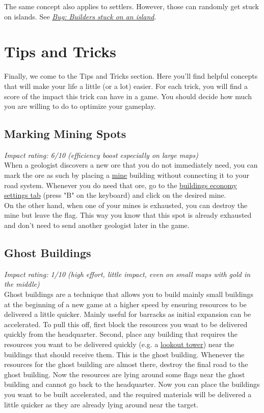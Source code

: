 \documentclass[12pt]{article}
\begin{document}
The same concept also applies to settlers. However, those can randomly get stuck on islands. See \textit{\hyperref[sec:buildersstuckonisland]{Bug: Builders stuck on an island}}.

\section{Tips and Tricks}
\label{sec:tipsandtricks}

Finally, we come to the Tips and Tricks section. Here you'll find helpful concepts that will make your life a little (or a lot) easier. For each trick, you will find a score of the impact this trick can have in a game. You should decide how much you are willing to do to optimize your gameplay.

\subsection{Marking Mining Spots}

\textit{Impact rating: 6/10 (efficiency boost especially on large maps)}\\

When a geologist discovers a new ore that you do not immediately need, you can mark the ore as such by placing a \hyperref[sec:mines]{mine} building without connecting it to your road system. Whenever you do need that ore, go to the \hyperref[sec:economybuildings]{buildings economy settings tab} (press "B" on the keyboard) and click on the desired mine.\\

On the other hand, when one of your mines is exhausted, you can destroy the mine but leave the flag. This way you know that this spot is already exhausted and don't need to send another geologist later in the game.

\subsection{Ghost Buildings}
\label{sec:ghostbuildings}

\textit{Impact rating: 1/10 (high effort, little impact, even on small maps with gold in the middle)}\\

Ghost buildings are a technique that allows you to build mainly small buildings at the beginning of a new game at a higher speed by ensuring resources to be delivered a little quicker. Mainly useful for barracks as initial expansion can be accelerated.
To pull this off, first block the resources you want to be delivered quickly from the headquarter. Second, place any building that requires the resources you want to be delivered quickly (e.g. a \hyperref[sec:lookouttower]{lookout tower}) near the buildings that should receive them. This is the ghost building. Whenever the resources for the ghost building are almost there, destroy the final road to the ghost building. Now the resources are lying around some flags near the ghost building and cannot go back to the headquarter. Now you can place the buildings you want to be built accelerated, and the required materials will be delivered a little quicker as they are already lying around near the target.
\end{document}
